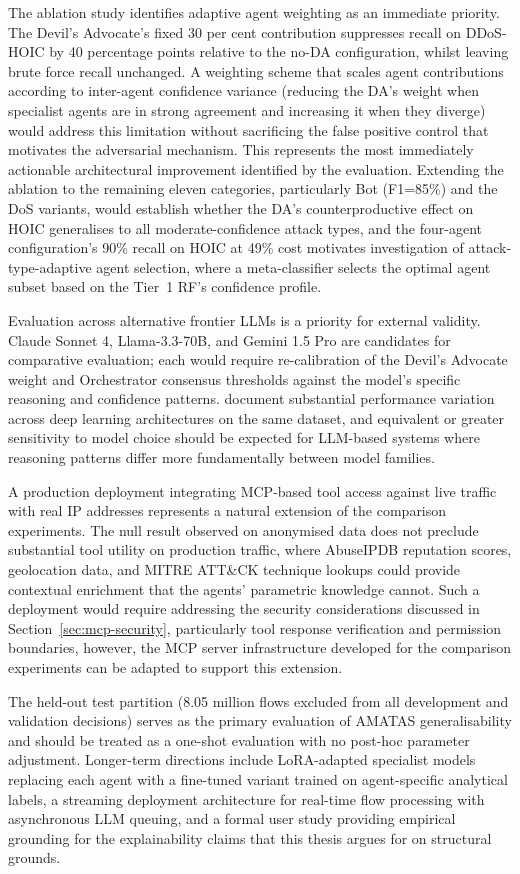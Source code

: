 \documentclass[../main.tex]{subfiles}
\begin{document}
The ablation study identifies adaptive agent weighting as an immediate priority. The Devil's Advocate's fixed 30 per cent contribution suppresses recall on DDoS-HOIC by 40 percentage points relative to the no-DA configuration, whilst leaving brute force recall unchanged. A weighting scheme that scales agent contributions according to inter-agent confidence variance (reducing the DA's weight when specialist agents are in strong agreement and increasing it when they diverge) would address this limitation without sacrificing the false positive control that motivates the adversarial mechanism. This represents the most immediately actionable architectural improvement identified by the evaluation. Extending the ablation to the remaining eleven categories, particularly Bot (F1=85\%) and the DoS variants, would establish whether the DA's counterproductive effect on HOIC generalises to all moderate-confidence attack types, and the four-agent configuration's 90\% recall on HOIC at 49\% cost motivates investigation of attack-type-adaptive agent selection, where a meta-classifier selects the optimal agent subset based on the Tier~1 RF's confidence profile.

Evaluation across alternative frontier LLMs is a priority for external validity. Claude Sonnet 4, Llama-3.3-70B, and Gemini 1.5 Pro are candidates for comparative evaluation; each would require re-calibration of the Devil's Advocate weight and Orchestrator consensus thresholds against the model's specific reasoning and confidence patterns. \textcite{Ferrag2020} document substantial performance variation across deep learning architectures on the same dataset, and equivalent or greater sensitivity to model choice should be expected for LLM-based systems where reasoning patterns differ more fundamentally between model families.

A production deployment integrating MCP-based tool access against live traffic with real IP addresses represents a natural extension of the comparison experiments. The null result observed on anonymised data does not preclude substantial tool utility on production traffic, where AbuseIPDB reputation scores, geolocation data, and MITRE ATT\&CK technique lookups could provide contextual enrichment that the agents' parametric knowledge cannot. Such a deployment would require addressing the security considerations discussed in Section~\ref{sec:mcp-security}, particularly tool response verification and permission boundaries, however, the MCP server infrastructure developed for the comparison experiments can be adapted to support this extension.

The held-out test partition (8.05 million flows excluded from all development and validation decisions) serves as the primary evaluation of AMATAS generalisability and should be treated as a one-shot evaluation with no post-hoc parameter adjustment. Longer-term directions include LoRA-adapted specialist models replacing each agent with a fine-tuned variant trained on agent-specific analytical labels, a streaming deployment architecture for real-time flow processing with asynchronous LLM queuing, and a formal user study providing empirical grounding for the explainability claims that this thesis argues for on structural grounds.

\onlystandalone{\printbibliography}
\end{document}
